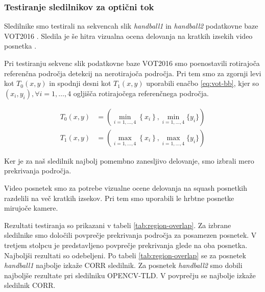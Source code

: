 \subsubsection{Testiranje sledilnikov za optični tok}\label{sec:testiranje-sledilnikov-za-opticni-tok}
Sledilnike smo testirali na sekvencah slik \textit{handball1} in \textit{handball2} podatkovne baze VOT2016 \cite{kristan2016visual}. Sledila je še hitra vizualna ocena delovanja na kratkih izsekih video posnetka \cite{squashtv2014squash}.

Pri testiranju sekvenc slik podatkovne baze VOT2016 smo poenostavili rotirajoča referenčna področja detekcij na nerotirajoča področja. Pri tem smo za zgornji levi kot $T_0(x,y)$ in spodnji desni kot $T_1(x,y)$ uporabili enačbo \eqref{eq:vot-bb}, kjer so $\left( x_i, y_i\right), \forall i=1,\ldots,4$ ogljišča rotirajočega referenčnega področja. 

\begin{equation}
\begin{aligned}
T_0(x,y) &= \left( \min_{i = 1,\ldots,4}\left\{x_i \right\}, 
\min_{i=1,\ldots,4}\{y_i \} \right) \\
T_1(x,y) &= \left( \max_{i = 1,\ldots,4}\left\{x_i \right\}, 
\max_{i=1,\ldots,4}\{y_i \} \right)
\end{aligned}
\label{eq:vot-bb}
\end{equation}

Ker je za naš sledilnik najbolj pomembno zanesljivo delovanje, smo izbrali mero prekrivanja področja.


Video posnetek \cite{squashtv2014squash} smo za potrebe vizualne ocene delovanja na squash posnetkih razdelili na več kratkih izsekov. Pri tem smo uporabili le hrbtne posnetke mirujoče kamere. 

Rezultati testiranja so prikazani v tabeli \ref{tab:region-overlap}. Za izbrane sledilnike smo določili povprečje prekrivanja področja za posamezen posnetek. V tretjem stolpcu je predstavljeno povprečje prekrivanja glede na oba posnetka. Najboljši rezultati so odebeljeni. Po tabeli \ref{tab:region-overlap} se za posnetek \textit{handball1} najbolje izkaže CORR sledilnik. Za posnetek \textit{handball2} smo dobili najboljše rezultate pri sledilniku OPENCV-TLD. V povprečju se najbolje izkaže sledilnik CORR.




